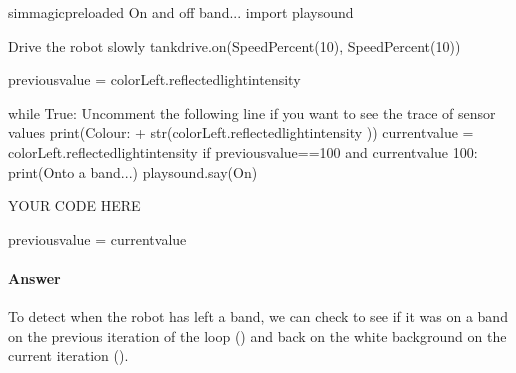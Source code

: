 \documentclass[letterpaper,10pt,english]{sphinxmanual}
\begin{document}
{
\begin{sphinxVerbatim}[commandchars=\\\{\}]
\llap{\color{nbsphinxin}[ ]:\,\hspace{\fboxrule}\hspace{\fboxsep}}\PYGZpc{}\PYGZpc{}sim\PYGZus{}magic\PYGZus{}preloaded
\PYGZsh{} On and off band...
import playsound

\PYGZsh{} Drive the robot slowly
tank\PYGZus{}drive.on(SpeedPercent(10), SpeedPercent(10))

previous\PYGZus{}value = colorLeft.reflected\PYGZus{}light\PYGZus{}intensity

while True:
    \PYGZsh{}Uncomment the following line if you want to see the trace of sensor values
    \PYGZsh{}print(\PYGZsq{}Colour: \PYGZsq{} + str(colorLeft.reflected\PYGZus{}light\PYGZus{}intensity ))
    current\PYGZus{}value = colorLeft.reflected\PYGZus{}light\PYGZus{}intensity
    if previous\PYGZus{}value==100 and current\PYGZus{}value \PYGZlt{} 100:
        print(\PYGZsq{}Onto a band...\PYGZsq{})
        playsound.say(\PYGZdq{}On\PYGZdq{})

    \PYGZsh{}YOUR CODE HERE


    previous\PYGZus{}value = current\PYGZus{}value
\end{sphinxVerbatim}
}


\paragraph{Answer}
\label{\detokenize{content/00_SOFTWARE_GUIDE/Section_00_03_quick_practical_tour:id3}}

To detect when the robot has left a band, we can check to see if it was on a band on the previous iteration of the  loop () and back on the white background on the current iteration ().
\end{document}
